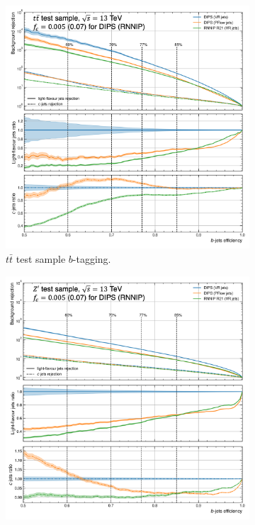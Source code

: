 \begin{figure}
  \vspace{0.5cm}
  \begin{subfigure}[t]{0.3\textwidth}
    \centering
    \includegraphics[scale=0.43]{Images/FTAG/VRDips/ROC/ttb.png}
    \caption{$t\bar{t}$ test sample $b$-tagging.}
    \label{fig:dipsVRROCtt}
  \end{subfigure}
  \hfill
  \begin{subfigure}[t]{0.3\textwidth}
    \centering
    \includegraphics[scale=0.43]{Images/FTAG/VRDips/ROC/zpb.png}

\end{subfigure}
\end{figure}
